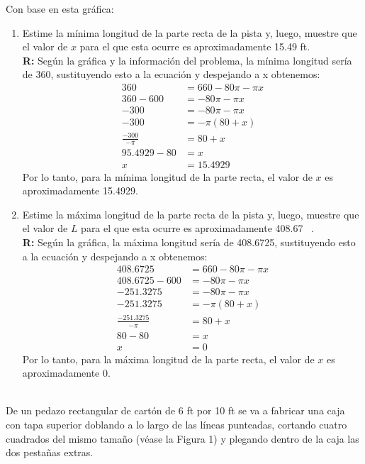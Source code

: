\documentclass[12pt]{article}
\begin{document}
\begin{enumerate}
    Con base en esta gráfica:
    \begin{enumerate}
        \item Estime la mínima longitud de la parte recta de la pista y, luego, muestre que el valor de \( x \) para el que esta ocurre es aproximadamente 15.49 ft.\\
        {\bf R:} Según la gráfica y la información del problema, la mínima longitud sería de 360, sustituyendo esto a la ecuación y despejando a x obtenemos:
        \begin{align*}
            360&=660-80\pi-\pi x\\
            360-600&=-80\pi-\pi x\\
            -300&=-80\pi-\pi x\\
            -300&=-\pi(80+x)\\
            \frac{-300}{-\pi}&=80+x\\
            95.4929 - 80 &= x\\
            x&=15.4929
        \end{align*}
        Por lo tanto, para la mínima longitud de la parte recta, el valor de $x$ es aproximadamente 15.4929.
        
        \item Estime la máxima longitud de la parte recta de la pista y, luego, muestre que el valor de \( L \) para el que esta ocurre es aproximadamente 408.67 \ .\\
    {\bf R:} Según la gráfica, la máxima longitud sería de 408.6725, sustituyendo esto a la ecuación y despejando a x obtenemos:
        \begin{align*}
            408.6725&=660-80\pi-\pi x\\
            408.6725-600&=-80\pi-\pi x\\
            -251.3275&=-80\pi-\pi x\\
            -251.3275&=-\pi(80+x)\\
            \frac{-251.3275}{-\pi}&=80+x\\
            80 - 80 &= x\\
            x&=0
        \end{align*}
    Por lo tanto, para la máxima longitud de la parte recta, el valor de $x$ es aproximadamente 0.
    \end{enumerate}
\end{enumerate}

     \\
    De un pedazo rectangular de cartón de 6 ft por 10 ft se va a fabricar una caja con tapa superior doblando a lo largo de las líneas punteadas, cortando cuatro cuadrados del mismo tamaño (véase la Figura 1) y plegando dentro de la caja las dos pestañas extras.
\end{document}

